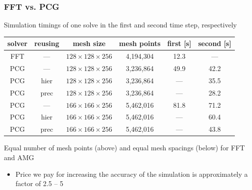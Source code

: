 \documentclass[xcolor=pdftex,table,10pt]{beamer}
\begin{document}
    \begin{frame}
        \frametitle{FFT vs. PCG}

        Simulation timings of one solve in the first and second time step, respectively

        \begin{center}
          \begin{tabular}{cccccc}
            \hline
            solver & reusing & mesh size & mesh points & first [s] & second [s] \\
            \hline
            FFT & --- & $128\times128\times256$ & 4,194,304 & 12.3 & --- \\
            \hline
            PCG & --- & $128\times128\times256$ & 3,236,864 & 49.9 & 42.2 \\
            PCG & hier & $128\times128\times256$ & 3,236,864 & --- & 35.5 \\
            PCG & prec & $128\times128\times256$ & 3,236,864 & --- & 28.2 \\
            \hline
            PCG & --- & $166\times166\times256$ & 5,462,016 & 81.8 & 71.2 \\
            PCG & hier & $166\times166\times256$ & 5,462,016 & --- & 60.4 \\
            PCG & prec & $166\times166\times256$ & 5,462,016 & --- & 43.8 \\
            \hline
          \end{tabular}

          \vspace{0.2cm}
          \tiny{Equal number of mesh points (above) and equal mesh spacings (below) for FFT and AMG}
        \end{center}

        \vspace{0.1cm}

        \begin{itemize}
            \item Price we pay for increasing the accuracy of the simulation is approximately a {\color{red!60}factor of 2.5 -- 5}
        \end{itemize}

    \end{frame}
\end{document}
